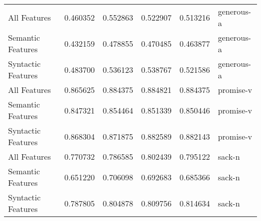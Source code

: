 \begin{tabular}{lrrrrl}
All Features       &       0.460352 &  0.552863 &    0.522907 &    0.513216 &   generous-a \\
Semantic Features  &       0.432159 &  0.478855 &    0.470485 &    0.463877 &   generous-a \\
Syntactic Features &       0.483700 &  0.536123 &    0.538767 &    0.521586 &   generous-a \\
All Features       &       0.865625 &  0.884375 &    0.884821 &    0.884375 &    promise-v \\
Semantic Features  &       0.847321 &  0.854464 &    0.851339 &    0.850446 &    promise-v \\
Syntactic Features &       0.868304 &  0.871875 &    0.882589 &    0.882143 &    promise-v \\
All Features       &       0.770732 &  0.786585 &    0.802439 &    0.795122 &       sack-n \\
Semantic Features  &       0.651220 &  0.706098 &    0.692683 &    0.685366 &       sack-n \\
Syntactic Features &       0.787805 &  0.804878 &    0.809756 &    0.814634 &       sack-n \\
\bottomrule
\end{tabular}
